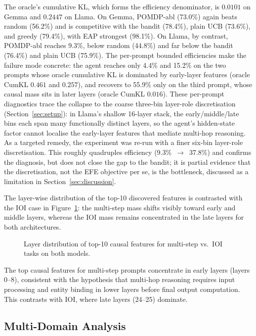The oracle's cumulative KL, which forms the efficiency denominator, is
$0.0101$ on Gemma and $0.2447$ on Llama.
On Gemma, POMDP-abl (73.0\%) again beats random (56.2\%) and is
competitive with the bandit (78.4\%), plain UCB (73.6\%), and greedy
(79.4\%), with EAP strongest (98.1\%).  On Llama, by contrast,
POMDP-abl reaches 9.3\%, below random (44.8\%)
and far below the bandit (76.4\%) and plain UCB (75.9\%).  The
per-prompt bounded efficiencies make the
failure mode concrete: the agent reaches only 4.4\% and 15.2\% on the
two prompts whose oracle cumulative KL is dominated by early-layer
features (oracle CumKL $0.461$ and $0.257$), and recovers to 55.9\% only
on the third prompt, whose causal mass sits in later layers (oracle
CumKL $0.016$).  These per-prompt diagnostics trace the collapse to the
coarse three-bin layer-role discretisation
(Section~\ref{sec:setup}): in Llama's shallow 16-layer stack, the
early/middle/late bins each span many functionally distinct layers, so
the agent's hidden-state factor cannot localise the early-layer
features that mediate multi-hop reasoning.  As a targeted remedy, the
experiment was re-run with a finer six-bin layer-role discretisation.
This roughly quadruples efficiency (9.3\%~$\rightarrow$~37.8\%) and
confirms the diagnosis, but does not close the gap to the bandit; it is
partial evidence that the discretisation, not the EFE
objective per se, is the bottleneck, discussed as a limitation in
Section~\ref{sec:discussion}.

The layer-wise distribution of the top-10 discovered features is
contrasted with the IOI case in Figure~\ref{fig:layer_dist}: the
multi-step mass shifts visibly toward early and middle layers,
whereas the IOI mass remains concentrated in the late layers for both
architectures.

\begin{figure}[H]
\centering

\caption{Layer distribution of top-10 causal features for multi-step vs.\ IOI tasks on both models.}
\label{fig:layer_dist}
\end{figure}

The top causal features for multi-step prompts concentrate in early
layers (layers 0--8), consistent with the hypothesis that multi-hop
reasoning requires input processing and entity binding in lower layers
before final output computation.  This contrasts with IOI, where
late layers (24--25) dominate.


\subsection{Multi-Domain Analysis}


